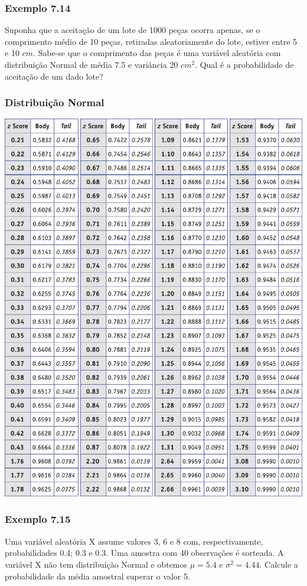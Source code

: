 \documentclass[11pt]{beamer}
\begin{document}
\begin{frame}
\begin{columns}
\begin{column}{0.5\textwidth}
\begin{center}
     \end{center}
\end{column}
\end{columns}

\end{frame}

\begin{frame}
\frametitle{Exemplo 7.14}
Suponha que a aceitação de um lote de 1000 peças ocorra apenas, se o comprimento médio de 10 peças, retiradas aleatoriamente do lote, estiver entre 5 e 10 \(cm\). Sabe-se que o comprimento das peças é uma variável aleatória com distribuição Normal de média 7.5 e variância 20 \(cm^2\). Qual é a probabilidade de aceitação de um dado lote?
\vspace{1in}
\vspace{1in}

\end{frame}

\begin{frame}
\frametitle{Distribuição Normal}

\begin{center}\includegraphics[width=0.5\linewidth]{figs/ztab_crop2} \end{center}
\end{frame}


\begin{frame}
\frametitle{Exemplo 7.15}
Uma variável aleatória X assume valores 3, 6 e 8 com, respectivamente, probabilidades 0.4; 0.3 e 0.3. Uma amostra com 40 observações é sorteada. A variável X não tem distribuição Normal e obtemos \(\mu=5.4\) e \(\sigma^2=4.44\). Calcule a probabilidade da média amostral superar o valor 5.
\vspace{1in}
\vspace{1in}

\end{frame}
\end{document}
